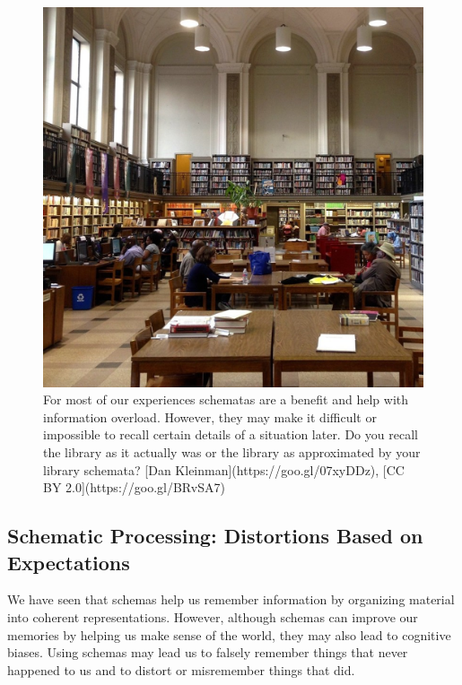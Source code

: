 \documentclass[
]{krantz}
\begin{document}
\begin{figure}

{\centering \includegraphics[width=0.6\linewidth]{images/ch6/fig1} 

}

\caption{For most of our experiences schematas are a benefit and help with information overload. However, they may make it difficult or impossible to recall certain details of a situation later. Do you recall the library as it actually was or the library as approximated by your library schemata? [Dan Kleinman](https://goo.gl/07xyDDz), [CC BY 2.0](https://goo.gl/BRvSA7)}\label{fig:library2}
\end{figure}

\hypertarget{schematic-processing-distortions-based-on-expectations}{%
\subsection*{Schematic Processing: Distortions Based on Expectations}\label{schematic-processing-distortions-based-on-expectations}}


We have seen that schemas help us remember information by organizing material into coherent representations. However, although schemas can improve our memories by helping us make sense of the world, they may also lead to cognitive biases. Using schemas may lead us to falsely remember things that never happened to us and to distort or misremember things that did.
\end{document}
